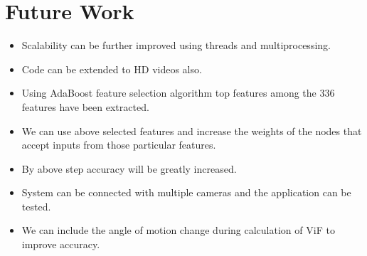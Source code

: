 \chapter{Future Work}
\begin{itemize}
	\item Scalability can be further improved using threads and multiprocessing.
	\item Code can be extended to HD videos also.
	\item Using AdaBoost feature selection algorithm top features among the 336 features have been extracted.
	\item We can use above selected features and increase the weights of the nodes that accept inputs from those particular features.
	\item By above step accuracy will be greatly increased.
	\item System can be connected with multiple cameras and the application can be tested.
	\item We can include the angle of motion change during calculation of ViF to improve accuracy.
\end{itemize}
